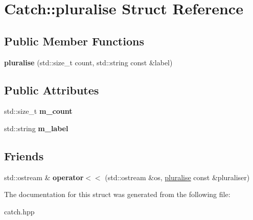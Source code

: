 \hypertarget{structCatch_1_1pluralise}{}\section{Catch\+::pluralise Struct Reference}
\label{structCatch_1_1pluralise}
\subsection*{Public Member Functions}
\begin{DoxyCompactItemize}
\item 
\mbox{\label{structCatch_1_1pluralise_a5c55e22de2416cfe416edf715c6b9234}} 
{\bfseries pluralise} (std\+::size\+\_\+t count, std\+::string const \&label)
\end{DoxyCompactItemize}
\subsection*{Public Attributes}
\begin{DoxyCompactItemize}
\item 
\mbox{\label{structCatch_1_1pluralise_a4dce2fa13ec6f00fac09b2418265441e}} 
std\+::size\+\_\+t {\bfseries m\+\_\+count}
\item 
\mbox{\label{structCatch_1_1pluralise_a8849cbdd3f11ebe7747597c8644e8793}} 
std\+::string {\bfseries m\+\_\+label}
\end{DoxyCompactItemize}
\subsection*{Friends}
\begin{DoxyCompactItemize}
\item 
\mbox{\label{structCatch_1_1pluralise_aa7dac6b165514c1f85e0695d678fdef5}} 
std\+::ostream \& {\bfseries operator$<$$<$} (std\+::ostream \&os, \mbox{\hyperlink{structCatch_1_1pluralise}{pluralise}} const \&pluraliser)
\end{DoxyCompactItemize}


The documentation for this struct was generated from the following file\+:\begin{DoxyCompactItemize}
\item 
catch.\+hpp\end{DoxyCompactItemize}
